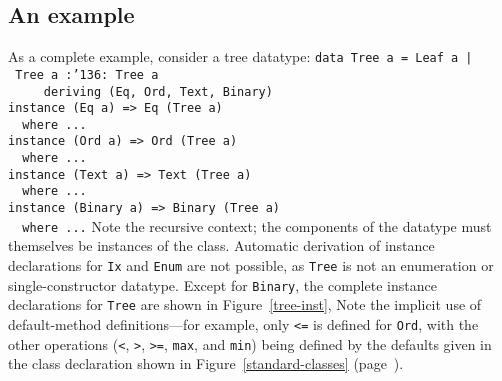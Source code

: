 \subsection{An example}

As a complete example, consider a tree datatype:\nopagebreak
\bprog
\mbox{\tt data\ Tree\ a\ =\ Leaf\ a\ |\ Tree\ a\ :{\char'136}:\ Tree\ a}\\
\mbox{\tt \ \ \ \ \ deriving\ (Eq,\ Ord,\ Text,\ Binary)}\\
\mbox{\tt instance\ (Eq\ a)\ =>\ Eq\ (Tree\ a)}\\
\mbox{\tt \ \ where\ ...}\\
\mbox{\tt instance\ (Ord\ a)\ =>\ Ord\ (Tree\ a)}\\
\mbox{\tt \ \ where\ ...}\\
\mbox{\tt instance\ (Text\ a)\ =>\ Text\ (Tree\ a)}\\
\mbox{\tt \ \ where\ ...}\\
\mbox{\tt instance\ (Binary\ a)\ =>\ Binary\ (Tree\ a)}\\
\mbox{\tt \ \ where\ ...}
\eprog
Note the recursive context; the components of the datatype must
themselves be instances of the class.  Automatic derivation of
instance
declarations for \mbox{\tt Ix} and \mbox{\tt Enum} are not possible, as \mbox{\tt Tree} is not
an enumeration or single-constructor datatype.  Except for \mbox{\tt Binary}, the complete
instance declarations for \mbox{\tt Tree} are shown in Figure~\ref{tree-inst},
Note the implicit use of default-method
definitions---for
example, only \mbox{\tt <=} is defined for \mbox{\tt Ord}, with the other
operations (\mbox{\tt <}, \mbox{\tt >}, \mbox{\tt >=}, \mbox{\tt max}, and \mbox{\tt min}) being defined by the defaults given in
the class declaration shown in Figure~\ref{standard-classes}
(page~\pageref{standard-classes}).

